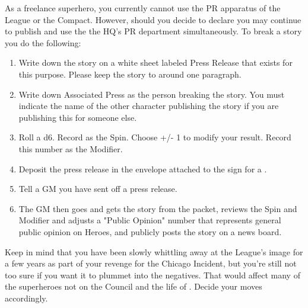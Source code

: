 \documentclass[green]{LRSguildcamp1}
\begin{document}
As a freelance superhero, you currently cannot use the PR apparatus of the League or the Compact. However, should you decide to declare you may continue to publish and use the the HQ's PR department simultaneously.  
To break a story you do the following:
\begin{enumerate}
\item Write down the story on a white sheet labeled Press Release that exists for this purpose. Please keep the story to around one paragraph. 

\item Write down Associated Press as the person breaking the story. You must indicate the name of the other character publishing the story if you are publishing this for someone else. 

\item Roll a d6. Record as the Spin. Choose +/- 1 to modify your result. Record this number as the Modifier. 

\item Deposit the press release in the envelope attached to the sign for a \sWallPhone{}. 

\item Tell a GM you have sent off a press release.

\item The GM then goes and gets the story from the packet, reviews the Spin and Modifier and adjusts a "Public Opinion" number that represents general public opinion on Heroes, and publicly posts the story on a news board. 
\end{enumerate}


Keep in mind that you have been slowly whittling away at the League's image for a few years as part of your revenge for the Chicago Incident, but you're still not too sure if you want it to plummet into the negatives. That would affect many of the superheroes not on the Council and the life of \cYoungest{}.  Decide your moves accordingly.
\end{document}
